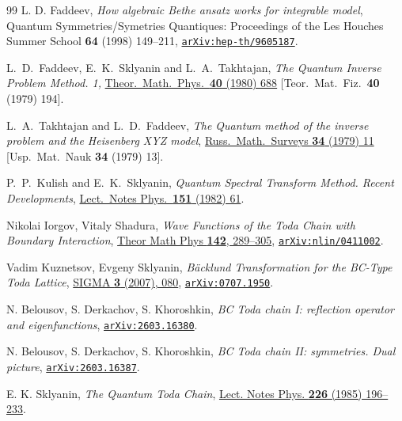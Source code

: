 \documentclass[a4paper,11pt]{article}
\numberwithin{equation}{section}
\begin{document}
\begin{thebibliography}{99}
 L. D. Faddeev, \textit{How algebraic Bethe ansatz works for integrable model}, Quantum Symmetries/Symetries Quantiques: Proceedings of the Les Houches Summer School \textbf{64} (1998) 149--211, \href{https://arxiv.org/abs/hep-th/9605187}{\texttt{arXiv:hep-th/9605187}}.

L.~D.~Faddeev, E.~K.~Sklyanin and L.~A.~Takhtajan,
\emph{The Quantum Inverse Problem Method. 1,}
\href{https://link.springer.com/article/10.1007/BF01018718}{Theor.\ Math.\ Phys.\  {\bf 40} (1980) 688}
[Teor.\ Mat.\ Fiz.\  {\bf 40} (1979) 194].

L.~A.~Takhtajan and L.~D.~Faddeev,
\emph{The Quantum method of the inverse problem and the Heisenberg XYZ model},
\href{https://www.mathnet.ru/php/archive.phtml?wshow=paper&jrnid=rm&paperid=4115&option_lang=eng}{Russ.\ Math.\ Surveys {\bf 34} (1979) 11}
[Usp.\ Mat.\ Nauk {\bf 34} (1979) 13].

P.~P.~Kulish and E.~K.~Sklyanin,
\emph{Quantum Spectral Transform Method. Recent Developments},
\href{https://link.springer.com/chapter/10.1007/3-540-11190-5_8}{Lect.\ Notes Phys.\  {\bf 151} (1982) 61}.


Nikolai Iorgov, Vitaly Shadura,
\textit{Wave Functions of the Toda Chain with Boundary Interaction},
\href{https://doi.org/10.1007/s11232-005-0012-2}{Theor Math Phys \textbf{142}, 289–305},
\href{https://arxiv.org/abs/nlin/0411002}{\texttt{arXiv:nlin/0411002}}.

Vadim Kuznetsov, Evgeny Sklyanin,
\textit{Bäcklund Transformation for the BC-Type Toda Lattice},
\href{https://doi.org/10.3842/SIGMA.2007.080}{SIGMA \textbf{3} (2007), 080},
\href{https://arxiv.org/abs/0707.1950}{\texttt{arXiv:0707.1950}}.

N. Belousov, S. Derkachov, S. Khoroshkin,
\textit{BC Toda chain I: reflection operator and eigenfunctions}, \href{https://arxiv.org/abs/2603.16380}{\texttt{arXiv:2603.16380}}.

N. Belousov, S. Derkachov, S. Khoroshkin,
\textit{BC Toda chain II: symmetries. Dual picture}, \href{https://arxiv.org/abs/2603.16387}{\texttt{arXiv:2603.16387}}.


 E. K. Sklyanin, \textit{The Quantum Toda Chain}, \href{https://doi.org/10.1007/3-540-15213-X_80}{Lect. Notes Phys. \textbf{226} (1985) 196--233}.


\end{thebibliography}
\end{document}
